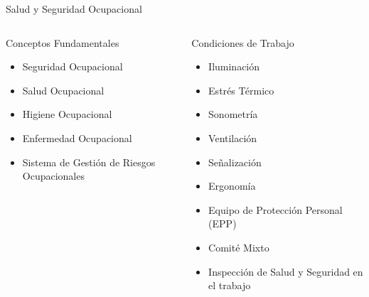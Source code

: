 \documentclass[spanish, aspectratio=169]{beamer}
\begin{document}
\begin{frame}[allowframebreaks]{Salud y Seguridad Ocupacional}

  \begin{columns}[T] %
    \begin{column}{0.5\textwidth}
      Conceptos Fundamentales
      \begin{itemize}
          \item Seguridad Ocupacional
          \item Salud Ocupacional
          \item Higiene Ocupacional
          \item Enfermedad Ocupacional
          \item Sistema de Gestión de Riesgos Ocupacionales
      \end{itemize}
    \end{column}
    \begin{column}{0.5\textwidth}
      Condiciones de Trabajo
      \begin{itemize}
          \item Iluminación
          \item Estrés Térmico
          \item Sonometría
          \item Ventilación
          \item Señalización
          \item Ergonomía
          \item Equipo de Protección Personal (EPP)
          \item Comité Mixto
          \item Inspección de Salud y Seguridad en el trabajo
      \end{itemize}
    \end{column}
  \end{columns}

  \framebreak


\end{frame}
\end{document}
